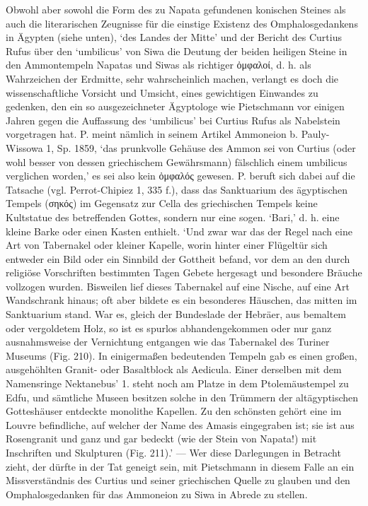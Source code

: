\documentclass[a4paper, 11pt, oneside]{article}
\begin{document}
Obwohl aber sowohl die Form des zu Napata gefundenen konischen Steines als auch die literarischen Zeugnisse für die einstige Existenz des Omphalosgedankens in Ägypten (siehe unten), `des Landes der Mitte' und der Bericht des Curtius Rufus über den `umbilicus' von Siwa die Deutung der beiden heiligen Steine in den Ammontempeln Napatas und Siwas als richtiger ὀμφαλοί, d. h. als Wahrzeichen der Erdmitte, sehr wahrscheinlich machen, verlangt es doch die wissenschaftliche Vorsicht und Umsicht, eines gewichtigen Einwandes zu gedenken, den ein so ausgezeichneter Ägyptologe wie Pietschmann vor einigen Jahren gegen die Auffassung des `umbilicus' bei Curtius Rufus als Nabelstein vorgetragen hat. P. meint nämlich in seinem Artikel Ammoneion b. Pauly-Wissowa 1, Sp. 1859, `das prunkvolle Gehäuse des Ammon sei von Curtius (oder wohl besser von dessen griechischem Gewährsmann) fälschlich einem umbilicus verglichen worden,' es sei also kein ὀμφαλός gewesen. P. beruft sich dabei auf die Tatsache (vgl. Perrot-Chipiez 1, 335 f.), dass das Sanktuarium des ägyptischen Tempels (σηκός) im Gegensatz zur Cella des griechischen Tempels keine Kultstatue des betreffenden Gottes, sondern nur eine sogen. `Bari,' d. h. eine kleine Barke oder einen Kasten enthielt. `Und zwar war das der Regel nach eine Art von Tabernakel oder kleiner Kapelle, worin hinter einer Flügeltür sich entweder ein Bild oder ein Sinnbild der Gottheit befand, vor dem an den durch religiöse Vorschriften bestimmten Tagen Gebete hergesagt und besondere Bräuche vollzogen wurden. Bisweilen lief dieses Tabernakel auf eine Nische, auf eine Art Wandschrank hinaus; oft aber bildete es ein besonderes Häuschen, das mitten im Sanktuarium stand. War es, gleich der Bundeslade der Hebräer, aus bemaltem oder vergoldetem Holz, so ist es spurlos abhandengekommen oder nur ganz ausnahmsweise der Vernichtung entgangen wie das Tabernakel des Turiner Museums (Fig. 210). In einigermaßen bedeutenden Tempeln gab es einen großen, ausgehöhlten Granit- oder Basaltblock als Aedicula. Einer derselben mit dem Namensringe Nektanebus' 1. steht noch am Platze in dem Ptolemäustempel zu Edfu, und sämtliche Museen besitzen solche in den Trümmern der altägyptischen Gotteshäuser entdeckte monolithe Kapellen. Zu den schönsten gehört eine im Louvre befindliche, auf welcher der Name des Amasis eingegraben ist; sie ist aus Rosengranit und ganz und gar bedeckt (wie der Stein von Napata!) mit Inschriften und Skulpturen (Fig. 211).' --- Wer diese Darlegungen in Betracht zieht, der dürfte in der Tat geneigt sein, mit Pietschmann in diesem Falle an ein Missverständnis des Curtius und seiner griechischen Quelle zu glauben und den Omphalosgedanken für das Ammoneion zu Siwa in Abrede zu stellen.
\end{document}
